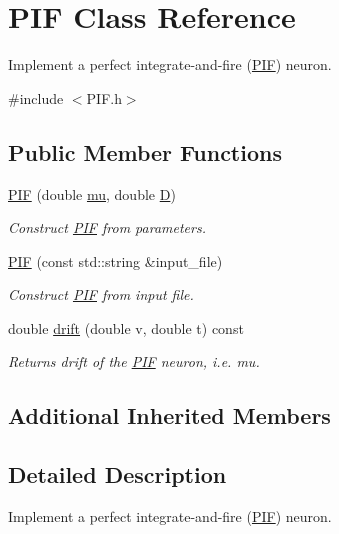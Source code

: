 \hypertarget{classPIF}{}\section{P\+IF Class Reference}
\label{classPIF}


Implement a perfect integrate-\/and-\/fire (\hyperlink{classPIF}{P\+IF}) neuron.  




{\ttfamily \#include $<$P\+I\+F.\+h$>$}

\subsection*{Public Member Functions}
\begin{DoxyCompactItemize}
\item 
\hyperlink{classPIF_ac3aaa22c006e70efc91de66078b2dbd2}{P\+IF} (double \hyperlink{classIF_a9f690c993d7b7cd0095e26607503db72}{mu}, double \hyperlink{classIF_a7e0fdbf32975dba0acf8096524885639}{D})
\begin{DoxyCompactList}\small\item\em Construct \hyperlink{classPIF}{P\+IF} from parameters. \end{DoxyCompactList}\item 
\hyperlink{classPIF_ad1a5859ea76a5ebd90d638ddea2bae90}{P\+IF} (const std\+::string \&input\+\_\+file)
\begin{DoxyCompactList}\small\item\em Construct \hyperlink{classPIF}{P\+IF} from input file. \end{DoxyCompactList}\item 
double \hyperlink{classPIF_a12aaacff008d1366ddb6fc3ca0e3ed51}{drift} (double v, double t) const
\begin{DoxyCompactList}\small\item\em Returns drift of the \hyperlink{classPIF}{P\+IF} neuron, i.\+e. mu. \end{DoxyCompactList}\end{DoxyCompactItemize}
\subsection*{Additional Inherited Members}


\subsection{Detailed Description}
Implement a perfect integrate-\/and-\/fire (\hyperlink{classPIF}{P\+IF}) neuron. 

